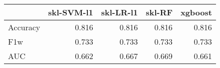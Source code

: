 \begin{tabular}{lrrrr}
\toprule
{} &  skl-SVM-l1 &  skl-LR-l1 &  skl-RF &  xgboost \\
\midrule
Accuracy &       0.816 &      0.816 &   0.816 &    0.816 \\
F1w      &       0.733 &      0.733 &   0.733 &    0.733 \\
AUC      &       0.662 &      0.667 &   0.669 &    0.661 \\
\bottomrule
\end{tabular}
